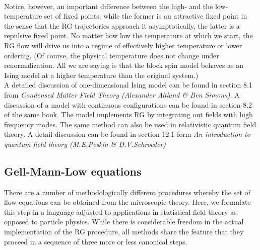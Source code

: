 \\
Notice, however, an important difference between the high- and the low-temperature set of fixed points: while the former is an attractive fixed point in the sense that the RG trajectories approach it asymptotically, the latter is a repulsive fixed point. No matter how low the temperature at which we start, the RG flow will drive us into a regime of effectively higher temperature or lower ordering. 
(Of course, the physical temperature does not change under renormalization. All we are saying is that the block spin model behaves as an Ising model at a higher temperature than the original system.)
\\
A detailed discussion of one-dimensional Ising model can be found in section 8.1 from \emph{Condensed Matter Field Theory (Alexander Altland \& Ben Simons)}. A discussion of a model with continuous configurations can be found in section 8.2 of the same book. The model implements RG by integrating out fields with high frequency modes. The same method can also be used in relativistic quantum  field theory. A detail discussion can be found in section 12.1 form \emph{An introduction to quantum field theory (M.E.Peskin \& D.V.Schroeder)}

\subsection{Gell-Mann-Low equations}
There are a number of methodologically different procedures whereby the set of flow equations can be obtained from the microscopic theory. Here, we formulate this step in a language adjusted to applications in statistical field theory as opposed to particle physics. While there is considerable freedom in the actual implementation of the RG procedure, all methods share the feature that they proceed in a sequence of three more or less canonical steps.

